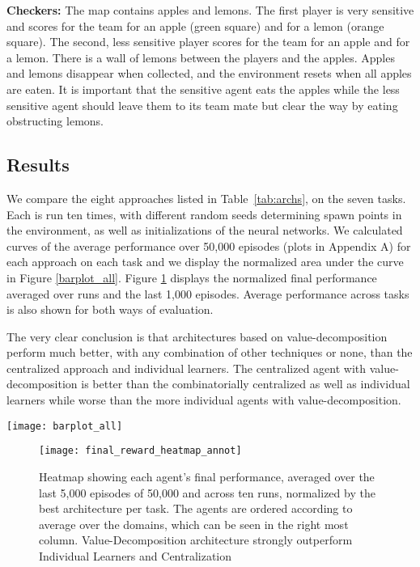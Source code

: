 \documentclass{article}
\begin{document}
\begin{SCfigure}
{\bf Checkers:} 
The map contains apples and lemons. The first player is very sensitive and scores  for the team for an apple (green square) and  for a lemon (orange square). The second, less sensitive player scores  for the team for an apple and  for a lemon. There is a wall of lemons between the players and the apples. Apples and lemons disappear when collected, and the environment resets when all apples are eaten. It is important that the sensitive agent eats the apples while the less sensitive agent should leave them to its team mate but clear the way by eating obstructing lemons. 



\subsection{Results}


We compare the eight approaches listed in Table~\ref{tab:archs}, on the seven tasks. Each is run ten times, with different random seeds determining spawn points in the environment, as well as initializations of the neural networks. 
We calculated curves of the average performance over 50,000 episodes (plots in Appendix A) for each approach on each task and we display the normalized area under the curve in Figure \ref{barplot_all}. Figure \ref{heat} displays the normalized final performance averaged over runs and the last 1,000 episodes. Average performance across tasks is also shown for both ways of evaluation.

The very clear conclusion is that architectures based on value-decomposition perform much better, with any combination of other techniques or none, than the centralized approach and individual learners. The centralized agent with value-decomposition is better than the combinatorially centralized as well as individual learners while worse than the more individual agents with value-decomposition. 



\begin{figure*}[t]
\texttt{[image: barplot\_all]}
\caption{Barplots showing normalized AUC for each agent and domain over 50000 episodes of training and the mean across domains.}\label{barplot_all}
\end{figure*}


 
 
 \begin{figure}
\begin{minipage}{.5\textwidth}
\texttt{[image: final\_reward\_heatmap\_annot]}
\caption{Heatmap showing each agent's final performance, averaged over the last 5,000 episodes of 50,000 and across ten runs, normalized by the best architecture per task. The agents are ordered according to average over the domains, which can be seen in the right most column. Value-Decomposition architecture strongly outperform Individual Learners and Centralization} \label{heat}


\end{minipage}
\end{figure}
\end{SCfigure}
\end{document}
